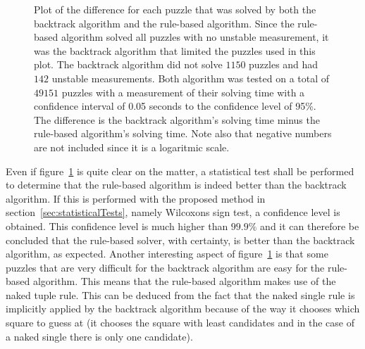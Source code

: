 \documentclass[a4paper,11pt]{kth-mag}
\begin{document}
\begin{figure}[here] 
\noindent{}
\vspace{-15pt}
\caption[Plot of puzzle difference between solvers]{Plot of the difference for each puzzle that was solved by both the backtrack algorithm and the rule-based algorithm. Since the rule-based algorithm solved all puzzles with no unstable measurement, it was the backtrack algorithm that limited the puzzles used in this plot. The backtrack algorithm did not solve $1150$ puzzles and had $142$ unstable measurements. 
Both algorithm was tested on a total of $49151$ puzzles with a measurement of their solving time with a confidence interval of 0.05 seconds to the confidence level of 95\%.
The difference is the backtrack algorithm's solving time minus the rule-based algorithm's solving time. Note also that negative numbers are not included since it is a logaritmic scale.}
\label{fig:comparison}
\end{figure}

Even if figure~\ref{fig:comparison} is quite clear on the matter, a statistical test shall be performed to determine that the rule-based algorithm is indeed better than the backtrack algorithm.
If this is performed with the proposed method in section~\ref{sec:statisticalTests}, namely Wilcoxons sign test, a confidence level is obtained.
This confidence level is much higher than $99.9\%$ and it can therefore be concluded that the rule-based solver, with certainty, is better than the backtrack algorithm, as expected. 
Another interesting aspect of figure~\ref{fig:comparison} is that some puzzles that are very difficult for the backtrack algorithm are easy for the rule-based algorithm.
This means that the rule-based algorithm makes use of the naked tuple rule.
This can be deduced from the fact that the naked single rule is implicitly applied by the backtrack algorithm because of the way it chooses which square to guess at (it chooses the square with least candidates and in the case of a naked single there is only one candidate).
\end{document}

